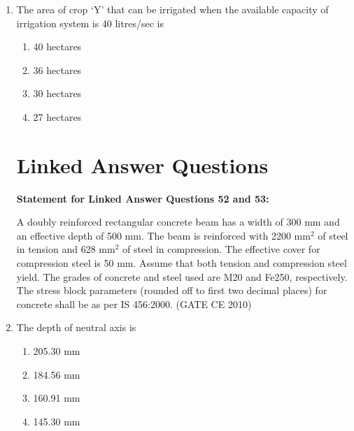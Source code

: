 \documentclass[journal]{IEEEtran}
\begin{document}
\begin{enumerate}
    
    \item The area of crop `Y' that can be irrigated when the available capacity of irrigation system is 40 litres/sec is

    \begin{multicols}{4}
        \begin{enumerate}
            \item 40 hectares
            \item 36 hectares
            \item 30 hectares
            \item 27 hectares
        \end{enumerate}
    \end{multicols}

    \section*{Linked Answer Questions}

    \textbf{Statement for Linked Answer Questions 52 and 53:}

    A doubly reinforced rectangular concrete beam has a width of 300 mm and an effective depth of 500 mm. The beam is reinforced with 2200 mm$^2$ of steel in tension and 628 mm$^2$ of steel in compression. The effective cover for compression steel is 50 mm. Assume that both tension and compression steel yield. The grades of concrete and steel used are M20 and Fe250, respectively. The stress block parameters (rounded off to first two decimal places) for concrete shall be as per IS 456:2000.  \hfill (GATE CE 2010) \\ 

    \item The depth of neutral axis is
    \begin{multicols}{4}
        \begin{enumerate}
            \item 205.30 mm
            \item 184.56 mm
            \item 160.91 mm
            \item 145.30 mm
        \end{enumerate}
    \end{multicols}

\end{enumerate}
\end{document}
